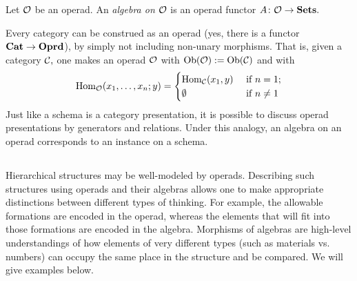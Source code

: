 \documentclass[../main/CT4S-EN-RU]{subfiles}
\begin{document}
\begin{exerciseRUS}
\end{exerciseRUS}

\begin{definitionENG}\label{def:operad algebra}
Let $\mathcal{O}$ be an operad. An {\em algebra on $\mathcal{O}$} is an operad functor $A\colon\mathcal{O}\rightarrow{\mathbf{Sets}}.$
\end{definitionENG}

\begin{definitionRUS}\label{def:operad algebra}
\end{definitionRUS}

\begin{remarkENG}
Every category can be construed as an operad (yes, there is a functor ${\mathbf{Cat}}\rightarrow{\mathbf{Oprd}}$), by simply not including non-unary morphisms. That is, given a category $\mathcal{C},$ one makes an operad $\mathcal{O}$ with $\operatorname{Ob}(\mathcal{O}):=\operatorname{Ob}(\mathcal{C})$ and with 
$$
\operatorname{Hom}_\mathcal{O}(x_1,\ldots,x_n;y)=
\begin{cases}
\operatorname{Hom}_\mathcal{C}(x_1,y)&\textnormal{ if }n=1;\\
\emptyset&\textnormal{ if }n\neq 1
\end{cases}
$$
Just like a schema is a category presentation, it is possible to discuss operad presentations by generators and relations. Under this analogy, an algebra on an operad corresponds to an instance on a schema.
\end{remarkENG}

\begin{remarkRUS}
\end{remarkRUS}


\subsection{}

\begin{blockENG}
Hierarchical structures may be well-modeled by operads. Describing such structures using operads and their algebras allows one to make appropriate distinctions between different types of thinking. For example, the allowable formations are encoded in the operad, whereas the elements that will fit into those formations are encoded in the algebra. Morphisms of algebras are high-level understandings of how elements of very different types (such as materials vs. numbers) can occupy the same place in the structure and be compared. We will give examples below.
\end{blockENG}
\end{document}
